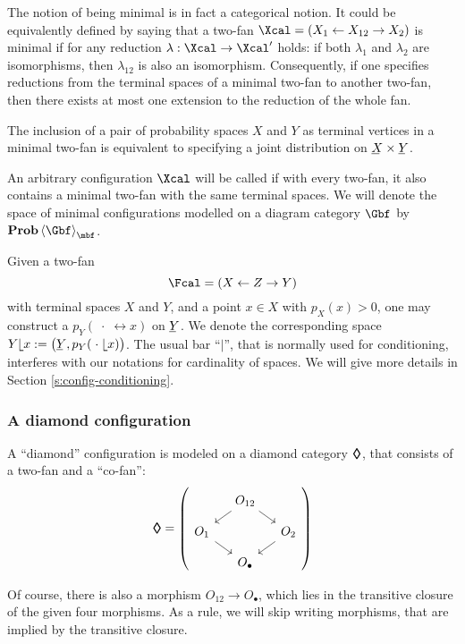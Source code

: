   The notion of being minimal is in fact a categorical notion. It could
  be equivalently defined by saying that a two-fan $\Xcal=(X_{1}\ot X_{12}\to
  X_{2})$ is minimal if for any reduction $\lambda:\Xcal\to\Xcal'$
  holds: if both $\lambda_{1}$ and $\lambda_{2}$ are isomorphisms, then
  $\lambda_{12}$ is also an isomorphism. Consequently, if one specifies
  reductions from the terminal spaces of a minimal two-fan to another
  two-fan, then there exists at most one extension to the reduction of the
  whole fan.

  The inclusion of a pair of probability
  spaces $X$ and $Y$ as terminal vertices in a minimal two-fan is
  equivalent to specifying a joint distribution on $\un X\times \un Y$.

  An arbitrary configuration $\Xcal$ will be called  if with every two-fan, it also contains a
  minimal two-fan with the same terminal spaces.
  We will denote the space of minimal configurations modelled on a
    diagram category $\Gbf$ by $\prob\<\Gbf>_{\mbf}$.

  Given a two-fan 
  \[
    \Fcal=(X\ot Z\to Y)
  \]
  with terminal spaces $X$ and $Y$, and a point $x \in X$ with $p_X(x) > 0$, one may construct a 
  $p_Y(\;\cdot\;\rel x)$ on $\un Y$. We denote the corresponding space
  $Y\rel x:=\big(\un Y,p_Y(\;\cdot\;\rel x)\big)$. The usual bar
  ``$|$'', that is normally used for conditioning, interferes with our
  notations for cardinality of spaces. 
  We will give more details in Section \ref{s:config-conditioning}.

\subsubsection{A diamond configuration}
\label{s:category-config-diamond}
  A ``diamond'' configuration is modeled on a diamond category ${\bm\Diamond}$,
  that consists of a two-fan and a ``co-fan'':
   \[
   \dia =
  \left(  \begin{tikzcd}[row sep=small, column sep=small]
  \mbox{}
  & 
  O_{12}
  \arrow{dl}{}
  \arrow{dr}{}
  &
  \\
  O_{1}
  \arrow{dr}{}
  & 
  &
  O_{2}
  \arrow{dl}{}
  \\
  \mbox{}
  &
  O_{\bullet}
  &
  \end{tikzcd} \right)
  \]
  
   Of course, there is also a morphism $O_{12}\to O_{\bullet}$, which
  lies in the transitive closure of the given four morphisms. As a
  rule, we will skip writing morphisms, that are implied by the
  transitive closure.

